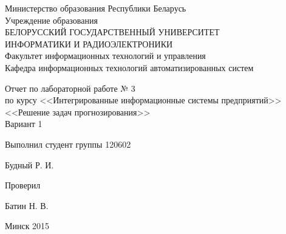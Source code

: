 \thispagestyle{empty}
\setlength{\parindent}{0ex} %

\begin{center}
  Министерство образования Республики Беларусь \\
  \vspace{0.5ex}
  Учреждение образования \\
  БЕЛОРУССКИЙ ГОСУДАРСТВЕННЫЙ УНИВЕРСИТЕТ \\
  ИНФОРМАТИКИ И РАДИОЭЛЕКТРОНИКИ \\
  \vspace{0.5ex}
  Факультет информационных технологий и управления \\
  \vspace{0.5ex}
  Кафедра информационных технологий автоматизированных систем
\end{center}

\vspace{50mm}

\begin{center}
  Отчет по лабораторной работе № 3 \\
  по курсу <<Интегрированные информационные системы предприятий>> \\
  <<Решение задач прогнозирования>> \\
  Вариант 1
\end{center}

\vspace{40mm}

\begin{minipage}{.55\linewidth}
    Выполнил студент группы 120602
\end{minipage}
\hfill
\begin{minipage}{.4\linewidth}
  \begin{flushright}
    Будный Р. И.
  \end{flushright}
\end{minipage}

\begin{minipage}{.55\linewidth}
    Проверил
\end{minipage}
\hfill
\begin{minipage}{.4\linewidth}
  \begin{flushright}
    Батин Н. В.
  \end{flushright}
\end{minipage}

\vspace{55mm}
\begin{center}
  Минск 2015
\end{center}

\setlength{\parindent}{5ex} %

\newpage

